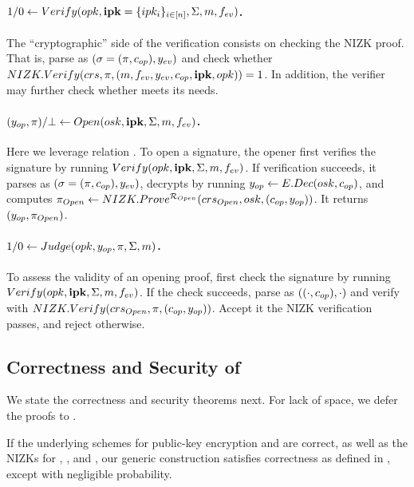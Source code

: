 \paragraph{$1/0 \gets Verify(opk,\mathbf{ipk}=\lbrace ipk_i\rbrace_{i\in[n]},
  \Sigma,m,f_{ev})$.} %
The ``cryptographic'' side of the verification consists on checking
the NIZK proof. That is, parse \Sig as $(\sigma = (\pi,c_{op}),y_{ev})$ and
check whether $NIZK.Verify(crs,\pi,(m,f_{ev},y_{ev},
c_{op},\mathbf{ipk},opk)) = 1$. In addition, the verifier may further check
whether \yeval meets its needs.

\paragraph{$(y_{op},\pi)/\bot \gets
  Open(osk,\mathbf{ipk},\Sigma,m,f_{ev})$.} %
Here we leverage relation \RelIns.
%
To open a signature, the opener first verifies the signature by running $Verify
(opk,\mathbf{ipk}, \Sigma,m,f_{ev})$. If verification succeeds, it parses
\Sig as $(\sigma=(\pi,c_{op}),y_{ev})$, decrypts \Ec by running $y_{op}
\gets E.Dec(osk,c_{op})$, and computes $\pi_{Open} \gets
NIZK.Prove^{\mathcal{R}_{Open}}(crs_{Open},osk,(c_{op},y_{op}))$. It
returns $(y_{op},\pi_{Open})$.

\paragraph{$1/0 \gets Judge(opk,y_{op},\pi,\Sigma,m)$.} %
To assess the validity of an opening proof, first check the signature
by running $Verify(opk,\mathbf{ipk},\Sigma,m,f_{ev})$. If the check succeeds,
parse \Sig as $((\cdot,c_{op}),\cdot)$ and verify \NIZKproof with
$NIZK.Verify(crs_{Open},\pi,(c_{op},y_{op}))$. Accept it the NIZK
verification passes, and reject otherwise.

\subsection{Correctness and Security of \CUASGen}
\label{ssec:security-uas}

We state the correctness and security theorems next. For lack of space, we defer
the proofs to .

\begin{theorem}
  \label{thm:correctness-uas}
  If the underlying schemes for public-key encryption and \SBCM are correct, as
  well as the NIZKs for \RelIss, \RelSig,
  and \RelIns, our generic construction \CUASGen satisfies
  correctness as defined in , except with negligible
  probability.
\end{theorem}


